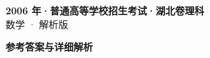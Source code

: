 \documentclass[zihao=-4, a4paper]{ctexart}
\begin{document}
\begin{center}
  {\Large\bfseries 2006 年·普通高等学校招生考试·湖北卷理科}\\[4pt]
  {\large 数学 · 解析版}
\end{center}
\medskip
{}

\clearpage
{}
\begin{center}{\Large\bfseries 参考答案与详细解析}\end{center}
\medskip

\end{document}
